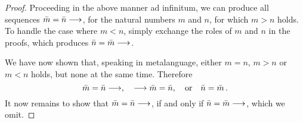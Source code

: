 \begin{proof}
    Proceeding in the above manner ad infinitum,
    we can produce all sequences \(\bar m=\bar n\longrightarrow\),
    for the natural numbers \(m\) and \(n\), for which \(m > n\) holds.
    To handle the case where \(m < n\), simply exchange the roles
    of \(m\) and \(n\) in the proofs, which produces \(\bar n=\bar m\longrightarrow\).

    We have now shown that, speaking in metalanguage,
    either \(m=n\), \(m>n\) or \(m < n\) holds,
    but none at the same time. Therefore
    \begin{equation*}
        \bar m = \bar n\longrightarrow,\quad
        \longrightarrow\bar m=\bar n,
        \quad\text{or}\quad
        \bar n=\bar m\,.
    \end{equation*}
    It now remains to show that \(\bar m=\bar n\longrightarrow\),
    if and only if \(\bar n=\bar m\longrightarrow\), which we omit.
\end{proof}
